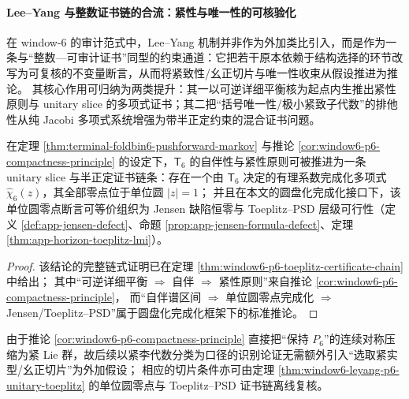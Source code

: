 
\paragraph{Lee--Yang 与整数证书链的合流：紧性与唯一性的可核验化}
在 window-\(6\) 的审计范式中，Lee--Yang 机制并非作为外加类比引入，而是作为一条与“整数—可审计证书”同型的约束通道：它把若干原本依赖于结构选择的环节改写为可复核的不变量断言，从而将紧致性/幺正切片与唯一性收束从假设推进为推论。
其核心作用可归纳为两类提升：其一以可逆详细平衡核为起点内生推出紧性原则与 unitary slice 的多项式证书；其二把“括号唯一性/极小紧致子代数”的排他性从纯 Jacobi 多项式系统增强为带半正定约束的混合证书问题。

\begin{theorem}\label{thm:window6-leyang-p6-unitary-toeplitz}
在定理 \ref{thm:terminal-foldbin6-pushforward-markov} 与推论 \ref{cor:window6-p6-compactness-principle} 的设定下，\(\mathsf{T}_6\) 的自伴性与紧性原则可被推进为一条 unitary slice 与半正定证书链条：存在一个由 \(\mathsf{T}_6\) 决定的有理系数完成化多项式 \(\widehat{\chi}_6(z)\)，其全部零点位于单位圆 \(|z|=1\)；
并且在本文的圆盘化完成化接口下，该单位圆零点断言可等价组织为 Jensen 缺陷恒零与 Toeplitz--PSD 层级可行性（定义 \ref{def:app-jensen-defect}、命题 \ref{prop:app-jensen-formula-defect}、定理 \ref{thm:app-horizon-toeplitz-lmi}）。
\end{theorem}

\begin{proof}
该结论的完整链式证明已在定理 \ref{thm:window6-p6-toeplitz-certificate-chain} 中给出；
其中“可逆详细平衡 \(\Rightarrow\) 自伴 \(\Rightarrow\) 紧性原则”来自推论 \ref{cor:window6-p6-compactness-principle}，
而“自伴谱区间 \(\Rightarrow\) 单位圆零点完成化 \(\Rightarrow\) Jensen/Toeplitz--PSD”属于圆盘化完成化框架下的标准推论。
\end{proof}

\begin{remark}[紧致性作为推论条件]\label{rem:window6-compactness-not-assumption}
由于推论 \ref{cor:window6-p6-compactness-principle} 直接把“保持 \(P_6\)”的连续对称压缩为紧 Lie 群，故后续以紧李代数分类为口径的识别论证无需额外引入“选取紧实型/幺正切片”为外加假设；
相应的切片条件亦可由定理 \ref{thm:window6-leyang-p6-unitary-toeplitz} 的单位圆零点与 Toeplitz--PSD 证书链离线复核。
\end{remark}

